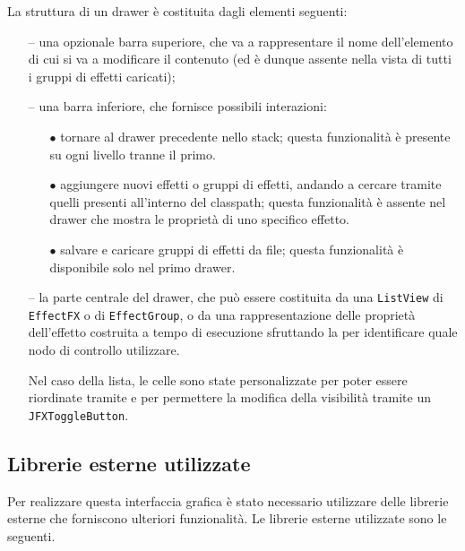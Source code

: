             La struttura di un drawer è costituita dagli elementi seguenti:
            \begin{itemize}
                \item[--] una opzionale barra superiore, che va a rappresentare il nome dell'elemento di cui si va a modificare il contenuto (ed è dunque assente nella vista di tutti i gruppi di effetti caricati);

                \item[--] una barra inferiore, che fornisce possibili interazioni:
                \begin{itemize}
                    \item[$\bullet$] tornare al drawer precedente nello stack; questa funzionalità è presente su ogni livello tranne il primo.
                    \item[$\bullet$] aggiungere nuovi effetti o gruppi di effetti, andando a cercare tramite  quelli presenti all'interno del classpath; questa funzionalità è assente nel drawer che mostra le proprietà di uno specifico effetto.
                    \item[$\bullet$] salvare e caricare gruppi di effetti da file; questa funzionalità è disponibile solo nel primo drawer.
                \end{itemize}

                \item[--] la parte centrale del drawer, che può essere costituita da una \texttt{ListView} di \texttt{EffectFX} o di \texttt{EffectGroup}, o da una rappresentazione delle proprietà dell'effetto costruita a tempo di esecuzione sfruttando la  per identificare quale nodo di controllo utilizzare.

                Nel caso della lista, le celle sono state personalizzate per poter essere riordinate tramite  e per permettere la modifica della visibilità tramite un \texttt{JFXToggleButton}. %

            \end{itemize}


        \subsection{Librerie esterne utilizzate}\label{sub:lib}
            Per realizzare questa interfaccia grafica è stato necessario utilizzare delle librerie esterne che forniscono ulteriori funzionalità.
            Le librerie esterne utilizzate sono le seguenti.

